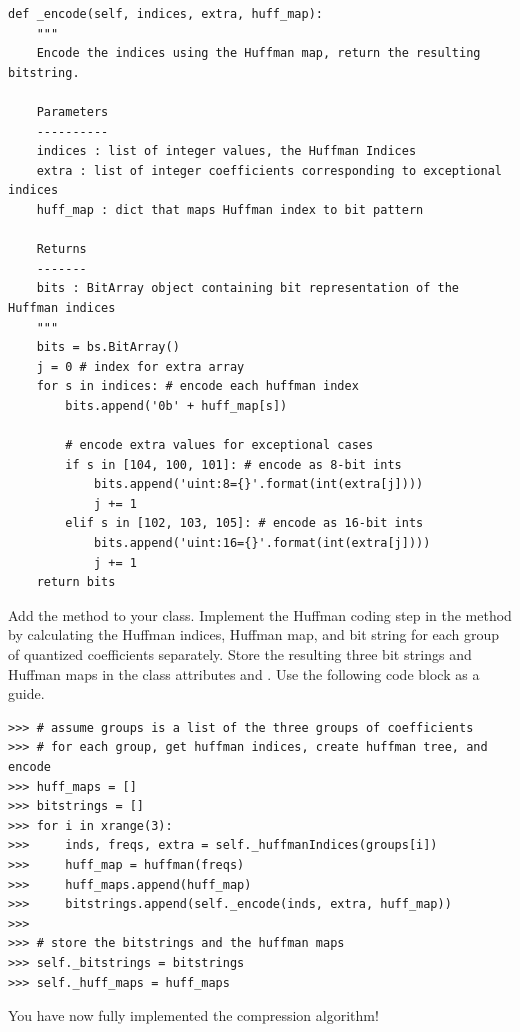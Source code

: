 \begin{lstlisting}
def _encode(self, indices, extra, huff_map):
    """
    Encode the indices using the Huffman map, return the resulting bitstring.

    Parameters
    ----------
    indices : list of integer values, the Huffman Indices
    extra : list of integer coefficients corresponding to exceptional indices
    huff_map : dict that maps Huffman index to bit pattern

    Returns
    -------
    bits : BitArray object containing bit representation of the Huffman indices
    """
    bits = bs.BitArray()
    j = 0 # index for extra array
    for s in indices: # encode each huffman index
        bits.append('0b' + huff_map[s])

        # encode extra values for exceptional cases
        if s in [104, 100, 101]: # encode as 8-bit ints
            bits.append('uint:8={}'.format(int(extra[j])))
            j += 1
        elif s in [102, 103, 105]: # encode as 16-bit ints
            bits.append('uint:16={}'.format(int(extra[j])))
            j += 1
    return bits
\end{lstlisting}

\begin{problem}
Add the  method to your class.
Implement the Huffman coding step in the  method by calculating
the Huffman indices, Huffman map, and bit string for each group of quantized coefficients separately.
Store the resulting three bit strings and Huffman maps in the class attributes 
and .
Use the following code block as a guide.
\begin{lstlisting}
>>> # assume groups is a list of the three groups of coefficients
>>> # for each group, get huffman indices, create huffman tree, and encode
>>> huff_maps = []
>>> bitstrings = []
>>> for i in xrange(3):
>>>     inds, freqs, extra = self._huffmanIndices(groups[i])
>>>     huff_map = huffman(freqs)
>>>     huff_maps.append(huff_map)
>>>     bitstrings.append(self._encode(inds, extra, huff_map))
>>>
>>> # store the bitstrings and the huffman maps
>>> self._bitstrings = bitstrings
>>> self._huff_maps = huff_maps
\end{lstlisting}
You have now fully implemented the compression algorithm!
\end{problem}

